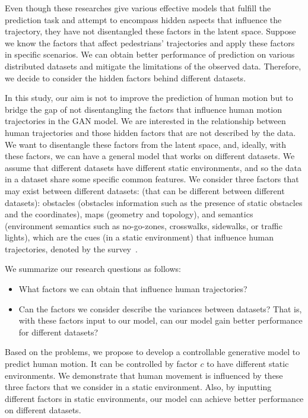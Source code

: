 Even though these researches give various effective models that fulfill the prediction task and attempt to encompass hidden aspects that influence the trajectory, they have not disentangled these factors in the latent space. Suppose we know the factors that affect pedestrians' trajectories and apply these factors in specific scenarios. We can obtain better performance of prediction on various distributed datasets and mitigate the limitations of the observed data. Therefore, we decide to consider the hidden factors behind different datasets.


In this study, our aim is not to improve the prediction of human motion but to bridge the gap of not disentangling the factors that influence human motion trajectories in the GAN model. We are interested in the relationship between human trajectories and those hidden factors that are not described by the data. We want to disentangle these factors from the latent space, and, ideally, with these factors, we can have a general model that works on different datasets. We assume that different datasets have different static environments, and so the data in a dataset share some specific common features. We consider three factors that may exist between different datasets: (that can be different between different datasets): obstacles (obstacles information such as the presence of static obstacles and the coordinates), maps (geometry and topology), and semantics (environment semantics such as no-go-zones, crosswalks, sidewalks, or traffic lights), which are the cues (in a static environment) that influence human trajectories, denoted by the survey~\cite{humanmotionsurvey}.

We summarize our research questions as follows:

\begin{itemize}
  \item What factors we can obtain that influence human trajectories?
  \item Can the factors we consider describe the variances between datasets? That is, with these factors input to our model, can our model gain better performance for different datasets?
\end{itemize}

Based on the problems, we propose to develop a controllable generative model to predict human motion. It can be controlled by factor $c$ to have different static environments. We demonstrate that human movement is influenced by these three factors that we consider in a static environment. Also, by inputting different factors in static environments, our model can achieve better performance on different datasets.
